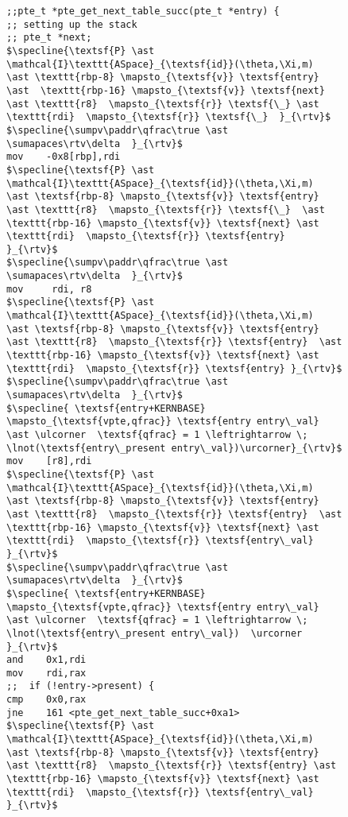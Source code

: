 \begin{figure}\footnotesize
  \begin{lstlisting}[mathescape]
;;pte_t *pte_get_next_table_succ(pte_t *entry) {
;; setting up the stack
;; pte_t *next;
$\specline{\textsf{P} \ast \mathcal{I}\texttt{ASpace}_{\textsf{id}}(\theta,\Xi,m)  \ast \texttt{rbp-8} \mapsto_{\textsf{v}} \textsf{entry} \ast  \texttt{rbp-16} \mapsto_{\textsf{v}} \textsf{next} \ast \texttt{r8}  \mapsto_{\textsf{r}} \textsf{\_} \ast \texttt{rdi}  \mapsto_{\textsf{r}} \textsf{\_}  }_{\rtv}$
$\specline{\sumpv\paddr\qfrac\true \ast \sumapaces\rtv\delta  }_{\rtv}$
mov    -0x8[rbp],rdi
$\specline{\textsf{P} \ast \mathcal{I}\texttt{ASpace}_{\textsf{id}}(\theta,\Xi,m)  \ast \textsf{rbp-8} \mapsto_{\textsf{v}} \textsf{entry} \ast \texttt{r8}  \mapsto_{\textsf{r}} \textsf{\_}  \ast  \texttt{rbp-16} \mapsto_{\textsf{v}} \textsf{next} \ast \texttt{rdi}  \mapsto_{\textsf{r}} \textsf{entry}  }_{\rtv}$
$\specline{\sumpv\paddr\qfrac\true \ast \sumapaces\rtv\delta  }_{\rtv}$
mov     rdi, r8
$\specline{\textsf{P} \ast \mathcal{I}\texttt{ASpace}_{\textsf{id}}(\theta,\Xi,m)  \ast \textsf{rbp-8} \mapsto_{\textsf{v}} \textsf{entry} \ast \texttt{r8}  \mapsto_{\textsf{r}} \textsf{entry}  \ast  \texttt{rbp-16} \mapsto_{\textsf{v}} \textsf{next} \ast \texttt{rdi}  \mapsto_{\textsf{r}} \textsf{entry} }_{\rtv}$
$\specline{\sumpv\paddr\qfrac\true \ast \sumapaces\rtv\delta  }_{\rtv}$
$\specline{ \textsf{entry+KERNBASE} \mapsto_{\textsf{vpte,qfrac}} \textsf{entry entry\_val} \ast \ulcorner  \textsf{qfrac} = 1 \leftrightarrow \; \lnot(\textsf{entry\_present entry\_val})\urcorner}_{\rtv}$
mov    [r8],rdi
$\specline{\textsf{P} \ast \mathcal{I}\texttt{ASpace}_{\textsf{id}}(\theta,\Xi,m)  \ast \textsf{rbp-8} \mapsto_{\textsf{v}} \textsf{entry} \ast \texttt{r8}  \mapsto_{\textsf{r}} \textsf{entry}  \ast  \texttt{rbp-16} \mapsto_{\textsf{v}} \textsf{next} \ast \texttt{rdi}  \mapsto_{\textsf{r}} \textsf{entry\_val}   }_{\rtv}$
$\specline{\sumpv\paddr\qfrac\true \ast \sumapaces\rtv\delta  }_{\rtv}$
$\specline{ \textsf{entry+KERNBASE} \mapsto_{\textsf{vpte,qfrac}} \textsf{entry entry\_val} \ast \ulcorner  \textsf{qfrac} = 1 \leftrightarrow \; \lnot(\textsf{entry\_present entry\_val})  \urcorner }_{\rtv}$
and    0x1,rdi
mov    rdi,rax
;;  if (!entry->present) {
cmp    0x0,rax
jne    161 <pte_get_next_table_succ+0xa1>
$\specline{\textsf{P} \ast \mathcal{I}\texttt{ASpace}_{\textsf{id}}(\theta,\Xi,m)  \ast \textsf{rbp-8} \mapsto_{\textsf{v}} \textsf{entry} \ast \texttt{r8}  \mapsto_{\textsf{r}} \textsf{entry} \ast \texttt{rbp-16} \mapsto_{\textsf{v}} \textsf{next} \ast \texttt{rdi}  \mapsto_{\textsf{r}} \textsf{entry\_val} }_{\rtv}$

\end{lstlisting}
\end{figure}

